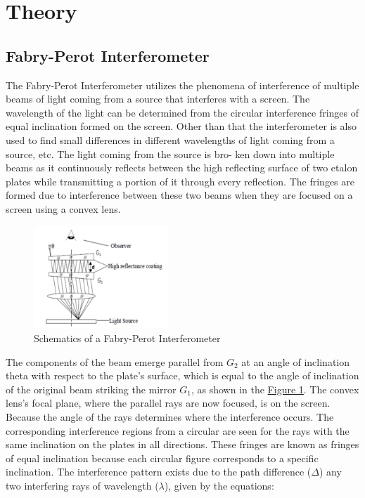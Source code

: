 \section{Theory}

	\subsection{Fabry-Perot Interferometer}
		The Fabry-Perot Interferometer utilizes the phenomena of interference of multiple beams of light coming from a source that interferes with a screen. The wavelength of the light can be determined from the circular interference fringes of equal inclination formed on the screen. Other than that the interferometer is also used to find small differences in different wavelengths of light coming from a source, etc. The light coming from the source is bro- ken down into multiple beams as it continuously reflects between the high reflecting surface of two etalon plates while transmitting a portion of it through every reflection. The fringes are formed due to interference between these two beams when they are focused on a screen using a convex lens.

		\begin{figure}[H]
			\centering
			\includegraphics[width=0.45\textwidth]{images/febry_perrot.png}
			\caption{Schematics of a Fabry-Perot Interferometer}
			\label{fig:1}
		\end{figure}

		The components of the beam emerge parallel from $G_2$ at an angle of inclination theta with respect to the plate's surface, which is equal to the angle of inclination of the original beam striking the mirror $G_1$, as shown in the \hyperref[fig:1]{Figure 1}. The convex lens's focal plane, where the parallel rays are now focused, is on the screen. Because the angle of the rays determines where the interference occurs. The corresponding interference regions from a circular are seen for the rays with the same inclination on the plates in all directions. These fringes are known as fringes of equal inclination because each circular figure corresponds to a specific inclination. The interference pattern exists due to the path difference ($\Delta$) any two interfering rays of wavelength ($\lambda$), given by the equations:

